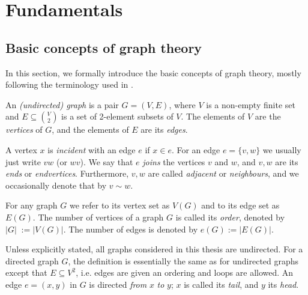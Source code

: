 \chapter{Fundamentals}

\section{Basic concepts of graph theory}
In this section, we formally introduce the basic concepts of graph theory, mostly following the terminology used in \cite{diestel}.

\begin{definition}
    An \textit{(undirected) graph} is a pair $G = (V, E)$, where $V$ is a non-empty finite set and $E \subseteq {\binom{V}{2}}$ is a set of 2-element subsets of $V$.
    The elements of $V$ are the \textit{vertices} of $G$, and the elements of $E$ are its \textit{edges}. 
    
    A vertex $x$ is \textit{incident} with an edge $e$ if $x \in e$. 
    For an edge $e = \{v, w\}$ we usually just write $vw$ (or $wv$). We say that $e$ \textit{joins} the vertices $v$ and $w$, and $v, w$ are its \textit{ends} or \textit{endvertices}. 
    Furthermore, $v, w$ are called \textit{adjacent} or \textit{neighbours}, and we occasionally denote that by $v \sim w$.

    For any graph $G$ we refer to its vertex set as $V(G)$ and to its edge set as $E(G)$. The number of vertices of a graph $G$ is called its \textit{order}, denoted by $|G|\;:= |V(G)|$. The number of edges is denoted by $e(G) := |E(G)|$.
\end{definition}

Unless explicitly stated, all graphs considered in this thesis are undirected. 
For a directed graph $G$, the definition is essentially the same as for undirected graphs except that $E \subseteq V^2$, i.e. edges are given an ordering and loops are allowed. 
An edge $e = (x, y)$ in $G$ is directed \textit{from} $x$ \textit{to} $y$; $x$ is called its \textit{tail}, and $y$ its \textit{head}.


